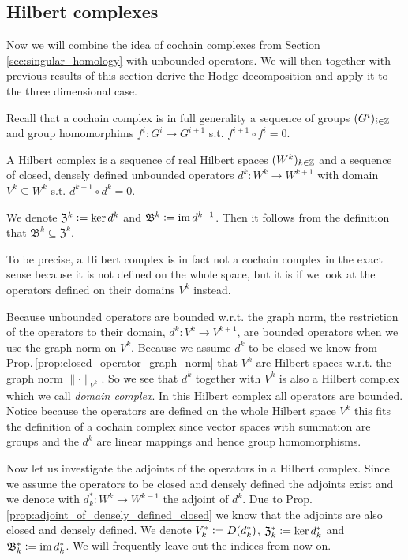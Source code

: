 \documentclass[../main.tex]{subfiles}
\begin{document}
\subsection{Hilbert complexes}

Now we will combine the idea of cochain complexes from Section 
\ref{sec:singular_homology} 
with unbounded operators. We will then together with previous results of
this section derive the Hodge decomposition and apply it to the three dimensional case.

Recall that a cochain complex 
is in full generality a sequence of groups $(G^i)_{i\in \mathbb{Z}}$ 
and group homomorphims $f^i: G^i \rightarrow G^{i+1}$ s.t. 
$f^{i+1} \circ f^{i} = 0$.

\begin{definition}
    A Hilbert complex is a sequence of real Hilbert spaces $(W^k)_{k\in \mathbb{Z}}$
    and a sequence of closed, densely defined 
    unbounded operators $d^k: W^k \rightarrow W^{k+1}$ with domain
    $V^k \subseteq W^k$ s.t. $d^{k+1} \circ d^k = 0$.
\end{definition}
\noindent We denote $\mathfrak{Z}^k  \vcentcolon= \ker d^k$ and $\mathfrak{B}^k 
\vcentcolon= \operatorname{im} d^{k-1}$. Then it follows from the definition that
$\mathfrak{B}^k \subseteq \mathfrak{Z}^k$. 

To be precise, a Hilbert complex is in fact not a cochain complex in the exact 
sense because it is not defined on the whole space, but it is if we look at
the operators defined on their domains $V^k$ instead.

Because unbounded operators are bounded w.r.t. the graph norm,
the restriction of the operators to their domain,
$d^k: V^k \rightarrow V^{k+1}$, are bounded operators when we use the graph norm
on $V^k$. 
Because we assume $d^k$ to be 
closed we know from Prop.\,\ref{prop:closed_operator_graph_norm}
that $V^k$ are Hilbert spaces w.r.t. the graph norm $\lVert \cdot \rVert _{V^k}$.
So we see that $d^k$ together with $V^k$ is also a Hilbert complex which 
we call \textit{domain complex}. In this Hilbert complex all operators are 
bounded. Notice because the operators are defined on the whole Hilbert space 
$V^k$ this fits the definition of a cochain complex since vector spaces 
with summation
are groups and the $d^k$ are linear mappings and hence group homomorphisms.

Now let us investigate the adjoints of the operators in a Hilbert complex.
Since we assume the operators to be closed and densely defined the adjoints 
exist and we denote with $d_k^*:W^k \rightarrow W^{k-1}$ the adjoint of $d^k$.
Due to Prop.\,\ref{prop:adjoint_of_densely_defined_closed} we know that the 
adjoints are also closed and densely defined. We denote 
$V_k^* \vcentcolon= D(d_k^*)$, $\mathfrak{Z}^*_k \vcentcolon= \ker d^*_k$ 
and $\mathfrak{B}^*_k \vcentcolon= \operatorname{im} d^*_k$. We will frequently leave out 
the indices from now on.
\end{document}

